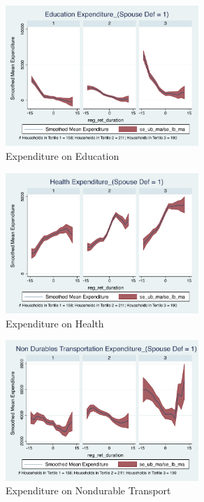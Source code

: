\documentclass[11pt,onecolumn]{article}
\numberwithin{figure}{section}
\begin{document}
\begin{figure}[h]
	\caption{Expenditure on Education}
	\centering
	\includegraphics[width=0.65\textwidth]{../ConsumptionPostRetirement_by_SpouseDef_Cats/Smoothed/1/spouse_def_total_education_real.pdf}
\end{figure}
\clearpage

\begin{figure}[h]
	\caption{Expenditure on Health}
	\centering
	\includegraphics[width=0.65\textwidth]{../ConsumptionPostRetirement_by_SpouseDef_Cats/Smoothed/1/spouse_def_total_healthexpense_real.pdf}
\end{figure}


\begin{figure}[h]
	\caption{Expenditure on Nondurable Transport}
	\centering
	\includegraphics[width=0.65\textwidth]{../ConsumptionPostRetirement_by_SpouseDef_Cats/Smoothed/1/spouse_def_total_transport_real.pdf}
\end{figure}
\clearpage
\end{document}
